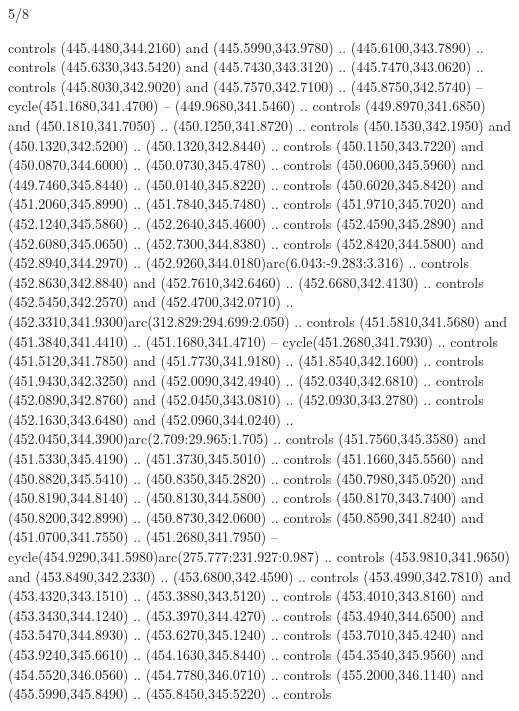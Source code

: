 \begin{flagdescription}{5/8}
\begin{scope}[xshift=0.5\flaglength,yshift=0.5\flagwidth,scale=\flagwidth/475.63]
\begin{scope}[y=0.8pt, x=0.8pt, yscale=-1, xscale=1,shift={(-450,-300)}]
\begin{scope}[cm={{1.0,0.0,0.0,1.0,(-0.0002,0.12556)}},cm={{1.0,0.0,0.0,1.0,(0.00179,0.0)}}]
\begin{scope}[cm={{1.01375,0.0,0.0,1.01375,(-5.36379,-4.94943)}}]
  controls (445.4480,344.2160) and (445.5990,343.9780) .. (445.6100,343.7890) ..
  controls (445.6330,343.5420) and (445.7430,343.3120) .. (445.7470,343.0620) ..
  controls (445.8030,342.9020) and (445.7570,342.7100) .. (445.8750,342.5740) --
  cycle(451.1680,341.4700) -- (449.9680,341.5460) .. controls
  (449.8970,341.6850) and (450.1810,341.7050) .. (450.1250,341.8720) .. controls
  (450.1530,342.1950) and (450.1320,342.5200) .. (450.1320,342.8440) .. controls
  (450.1150,343.7220) and (450.0870,344.6000) .. (450.0730,345.4780) .. controls
  (450.0600,345.5960) and (449.7460,345.8440) .. (450.0140,345.8220) .. controls
  (450.6020,345.8420) and (451.2060,345.8990) .. (451.7840,345.7480) .. controls
  (451.9710,345.7020) and (452.1240,345.5860) .. (452.2640,345.4600) .. controls
  (452.4590,345.2890) and (452.6080,345.0650) .. (452.7300,344.8380) .. controls
  (452.8420,344.5800) and (452.8940,344.2970) ..
  (452.9260,344.0180)arc(6.043:-9.283:3.316) .. controls (452.8630,342.8840) and
  (452.7610,342.6460) .. (452.6680,342.4130) .. controls (452.5450,342.2570) and
  (452.4700,342.0710) .. (452.3310,341.9300)arc(312.829:294.699:2.050) ..
  controls (451.5810,341.5680) and (451.3840,341.4410) .. (451.1680,341.4710) --
  cycle(451.2680,341.7930) .. controls (451.5120,341.7850) and
  (451.7730,341.9180) .. (451.8540,342.1600) .. controls (451.9430,342.3250) and
  (452.0090,342.4940) .. (452.0340,342.6810) .. controls (452.0890,342.8760) and
  (452.0450,343.0810) .. (452.0930,343.2780) .. controls (452.1630,343.6480) and
  (452.0960,344.0240) .. (452.0450,344.3900)arc(2.709:29.965:1.705) .. controls
  (451.7560,345.3580) and (451.5330,345.4190) .. (451.3730,345.5010) .. controls
  (451.1660,345.5560) and (450.8820,345.5410) .. (450.8350,345.2820) .. controls
  (450.7980,345.0520) and (450.8190,344.8140) .. (450.8130,344.5800) .. controls
  (450.8170,343.7400) and (450.8200,342.8990) .. (450.8730,342.0600) .. controls
  (450.8590,341.8240) and (451.0700,341.7550) .. (451.2680,341.7950) --
  cycle(454.9290,341.5980)arc(275.777:231.927:0.987) .. controls
  (453.9810,341.9650) and (453.8490,342.2330) .. (453.6800,342.4590) .. controls
  (453.4990,342.7810) and (453.4320,343.1510) .. (453.3880,343.5120) .. controls
  (453.4010,343.8160) and (453.3430,344.1240) .. (453.3970,344.4270) .. controls
  (453.4940,344.6500) and (453.5470,344.8930) .. (453.6270,345.1240) .. controls
  (453.7010,345.4240) and (453.9240,345.6610) .. (454.1630,345.8440) .. controls
  (454.3540,345.9560) and (454.5520,346.0560) .. (454.7780,346.0710) .. controls
  (455.2000,346.1140) and (455.5990,345.8490) .. (455.8450,345.5220) .. controls

\end{scope}
\end{scope}
\end{scope}
\end{scope}
\end{flagdescription}
